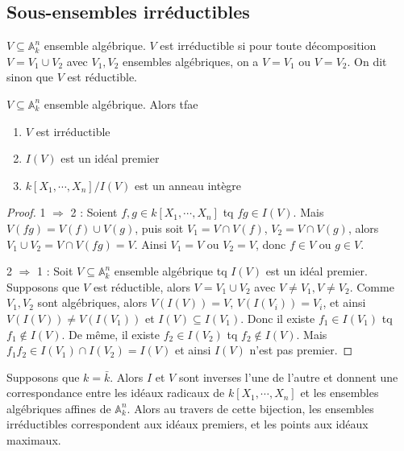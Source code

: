         \subsection{Sous-ensembles irréductibles}
            \begin{defi}
                $V \subseteq \mathbb{A}_k^n$ ensemble algébrique. $V$ est irréductible si pour toute décomposition $V = V_1 \cup V_2$ avec $V_1,V_2$ ensembles algébriques, on a $V = V_1$ ou $V = V_2$. On dit sinon que $V$ est réductible.
            \end{defi}
            \begin{prop}
                $V \subseteq \mathbb{A}_k^n$ ensemble algébrique. Alors tfae
                \begin{enumerate}
                    \item $V$ est irréductible
                    \item $I(V)$ est un idéal premier
                    \item $k[X_1, \cdots, X_n]/I(V)$ est un anneau intègre
                \end{enumerate}
            \end{prop}
            \begin{proof}
                \item 1 $\Rightarrow$ 2 : Soient $f,g \in k[X_1, \cdots, X_n]$ tq $fg \in I(V)$. Mais $V(fg) = V(f) \cup V(g)$, puis soit $V_1 = V \cap V(f)$, $V_2 = V \cap V(g)$, alors $V_1 \cup V_2 = V \cap V(fg) = V$. Ainsi $V_1 = V$ ou $V_2 = V$, donc $f \in V$ ou $g \in V$.
                \item 2 $\Rightarrow$ 1 : Soit $V \subseteq \mathbb{A}_k^n$ ensemble algébrique tq $I(V)$ est un idéal premier. Supposons que $V$ est réductible, alors $V = V_1 \cup V_2$ avec $V \neq V_1, V \neq V_2$. Comme $V_1,V_2$ sont algébriques, alors $V(I(V)) = V$, $V(I(V_i)) = V_i$, et ainsi $V(I(V)) \neq V(I(V_1))$ et $I(V) \subseteq I(V_1)$. Donc il existe $f_1 \in I(V_1)$ tq $f_1 \notin I(V)$. De même, il existe $f_2 \in I(V_2)$ tq $f_2 \notin I(V)$. Mais $f_1f_2 \in I(V_1) \cap I(V_2) = I(V)$ et ainsi $I(V)$ n'est pas premier.
            \end{proof}
            \begin{remq}
                Supposons que $k = \bar k$. Alors $I$ et $V$ sont inverses l'une de l'autre et donnent une correspondance entre les idéaux radicaux de $k[X_1, \cdots, X_n]$ et les ensembles algébriques affines de $\mathbb{A}_k^n$. Alors au travers de cette bijection, les ensembles irréductibles correspondent aux idéaux premiers, et les points aux idéaux maximaux.
            \end{remq}
